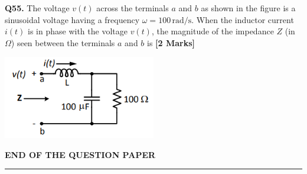 \documentclass[11pt]{article}
\newcommand{\questionb}[2]{
    \noindent\textbf{Q#2.} #1 \hfill \textbf{[2 Marks]}
}
\begin{document}
\questionb{The voltage \( v(t) \) across the terminals \( a \) and \( b \) as shown in the figure is a sinusoidal voltage having a frequency \( \omega = 100 \, \text{rad/s} \). When the inductor current \( i(t) \) is in phase with the voltage \( v(t) \), the magnitude of the impedance \( Z \) (in \( \Omega \)) seen between the terminals \( a \) and \( b \) is}{55}
\begin{center}
\includegraphics[width=0.5\textwidth]{figures/55.png}
\end{center}
\vspace{0.5cm}

\vspace{5cm}
\begin{center}
\textbf{END OF THE QUESTION PAPER} \\
\rule{\textwidth}{0.5pt}
\end{center}
\end{document}
